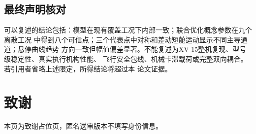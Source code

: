\documentclass[UTF8,12pt,oneside,openany,fontset=windows]{ctexbook}
\begin{document}
\section{最终声明核对}

可以复述的结论包括：模型在现有覆盖工况下内部一致；联合优化概念参数在九个离散工况 中得到八个可信点；三个代表点中对称和差动短舱运动显示不同主导通道；悬停曲线趋势 方向一致但幅值偏差显著。不能复述为XV-15整机复现、型号级稳定性、真实执行机构性能、 飞行安全包线、机械卡滞载荷或完整双向耦合。若引用者省略上述限定，所得结论将超过本 论文证据。

\backmatter
\printbibliography[heading=bibintoc,title={参考文献}]
\chapter*{致谢}
本页为致谢占位页，匿名送审版本不填写身份信息。
\end{document}
